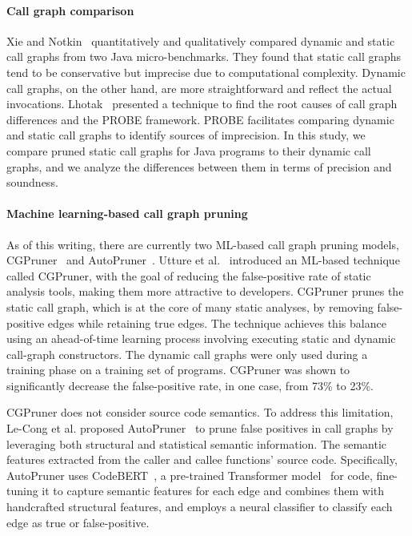 \paragraph{Call graph comparison}
Xie and Notkin~\cite{xie2002empirical} quantitatively and qualitatively compared dynamic and static call graphs from two Java micro-benchmarks. They found that static call graphs tend to be conservative but imprecise due to computational complexity. Dynamic call graphs, on the other hand, are more straightforward and reflect the actual invocations.
Lhotak~\cite{lhotak2007comparing} presented a technique to find the root causes of call graph differences and the PROBE framework. PROBE facilitates comparing dynamic and static call graphs to identify sources of imprecision.
In this study, we compare pruned static call graphs for Java programs to their dynamic call graphs, and we analyze the differences between them in terms of precision and soundness. 

\paragraph{Machine learning-based call graph pruning}
As of this writing, there are currently two ML-based call graph pruning models, CGPruner~\cite{utture2022striking} and AutoPruner~\cite{le2022autopruner}. Utture et al.~\cite{utture2022striking} introduced an ML-based technique called CGPruner, with the goal of reducing the false-positive rate of static analysis tools, making them more attractive to developers. CGPruner prunes the static call graph, which is at the core of many static analyses, by removing false-positive edges while retaining true edges. The technique achieves this balance using an ahead-of-time learning process involving executing static and dynamic call-graph constructors. The dynamic call graphs were only used during a training phase on a training set of programs. CGPruner was shown to significantly decrease the false-positive rate, in one case, from 73\% to 23\%.

CGPruner does not consider source code semantics. To address this limitation, Le-Cong et al. proposed AutoPruner~\cite{le2022autopruner} to prune false positives in call graphs by leveraging both structural and statistical semantic information. The semantic features extracted from the caller and callee functions' source code. Specifically, AutoPruner uses CodeBERT~\cite{feng2020codebert}, a pre-trained Transformer model~\cite{vaswani2017attention} for code, fine-tuning it to capture semantic features for each edge and combines them with handcrafted structural features, and employs a neural classifier to classify each edge as true or false-positive.

